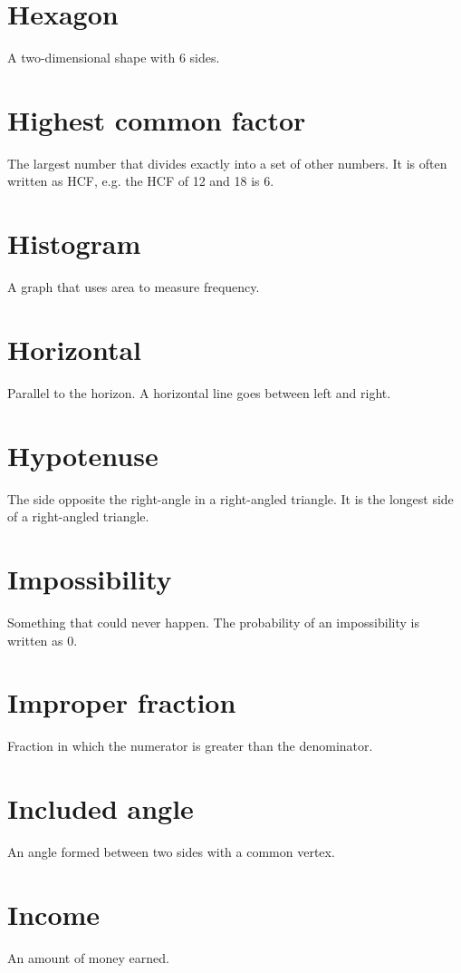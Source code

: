 \documentclass[10pt]{article}
\begin{document}
\section*{Hexagon}
A two-dimensional shape with 6 sides.

\section*{Highest common factor}
The largest number that divides exactly into a set of other numbers. It is often written as HCF, e.g. the HCF of 12 and 18 is 6.

\section*{Histogram}
A graph that uses area to measure frequency.

\section*{Horizontal}
Parallel to the horizon. A horizontal line goes between left and right.

\section*{Hypotenuse}
The side opposite the right-angle in a right-angled triangle. It is the longest side of a right-angled triangle.

\section*{Impossibility}
Something that could never happen. The probability of an impossibility is written as 0.

\section*{Improper fraction}
Fraction in which the numerator is greater than the denominator.

\section*{Included angle}
An angle formed between two sides with a common vertex.

\section*{Income}
An amount of money earned.
\end{document}
